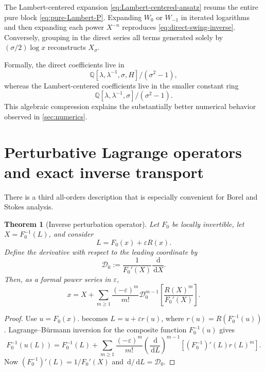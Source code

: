 \documentclass[11pt,a4paper]{article}
\numberwithin{equation}{section}
\newtheorem{theorem}{Theorem}[section]
\theoremstyle{definition}
\theoremstyle{remark}
\newcommand{\dd}{\,\mathrm d}
\begin{document}
The Lambert-centered expansion \cref{eq:Lambert-centered-ansatz} resums the
entire pure block \cref{eq:pure-Lambert-P}.  Expanding \(W_0\) or
\(W_{-1}\) in iterated logarithms and then expanding each power
\(X^{-n}\) reproduces \cref{eq:direct-swing-inverse}.  Conversely, grouping
in the direct series all terms generated solely by
\((\sigma/2)\log x\) reconstructs \(X_\sigma\).

Formally, the direct coefficients live in
\[
 \mathbb Q[\lambda,\lambda^{-1},\sigma,H]/(\sigma^2-1),
\]
whereas the Lambert-centered coefficients live in the smaller constant ring
\[
 \mathbb Q[\lambda,\lambda^{-1},\sigma]/(\sigma^2-1).
\]
This algebraic compression explains the substantially better numerical
behavior observed in \cref{sec:numerics}.

\section{Perturbative Lagrange operators and exact inverse transport}
\label{sec:operator-inversion}

There is a third all-orders description that is especially convenient for
Borel and Stokes analysis.

\begin{theorem}[Inverse perturbation operator]\label{thm:inverse-operator}
Let \(F_0\) be locally invertible, let \(X=F_0^{-1}(L)\), and consider
\begin{equation}\label{eq:perturbed-inverse-problem}
 L=F_0(x)+\varepsilon R(x).
\end{equation}
Define the derivative with respect to the leading coordinate by
\begin{equation}\label{eq:D0-operator}
 \mathscr D_0:=\frac1{F_0'(X)}\frac{\dd}{\dd X}.
\end{equation}
Then, as a formal power series in \(\varepsilon\),
\begin{equation}\label{eq:inverse-operator-formula}
 x=X+\sum_{m\ge1}\frac{(-\varepsilon)^m}{m!}
 \mathscr D_0^{m-1}
 \left[\frac{R(X)^m}{F_0'(X)}\right].
\end{equation}
\end{theorem}

\begin{proof}
Use \(u=F_0(x)\).   becomes
\(L=u+\varepsilon r(u)\), where
\(r(u)=R(F_0^{-1}(u))\).  Lagrange--B\"urmann inversion for the composite
function \(F_0^{-1}(u)\) gives
\[
 F_0^{-1}(u(L))=F_0^{-1}(L)
 +\sum_{m\ge1}\frac{(-\varepsilon)^m}{m!}
 \left(\frac{\dd}{\dd L}\right)^{m-1}
 \left[(F_0^{-1})'(L)r(L)^m\right].
\]
Now \((F_0^{-1})'(L)=1/F_0'(X)\) and
\(\dd/\dd L=\mathscr D_0\).
\end{proof}
\end{document}
